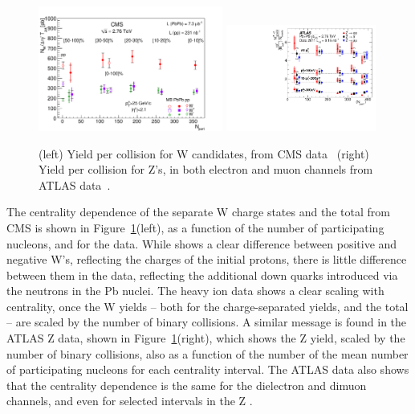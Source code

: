 \begin{figure}[!th]
\begin{center}
\includegraphics[width=0.54\textwidth]{electroweak_figs/Fig2.pdf}
\includegraphics[width=0.44\textwidth]{electroweak_figs/fig_04.pdf}
\caption[]{(left) Yield per collision for W candidates, from CMS data~\cite{Chatrchyan:2012nt} (right) Yield per collision for Z's, in both electron and muon channels from ATLAS data~\cite{Aad:2012ew}.}
\label{fig:pas:zw_cent}
\end{center}
\end{figure}

The centrality dependence of the separate W charge states and the total from CMS
is shown in Figure~\ref{fig:pas:zw_cent}(left),
as a function of the number of participating nucleons, and for the \pp data.
While \pp shows a clear difference between positive and negative W's, reflecting the charges of the initial protons, there is little
difference between them in the \PbPb data, reflecting the additional down quarks introduced via the neutrons in the Pb nuclei.
The heavy ion data shows a clear scaling with centrality, once the W yields -- both for the charge-separated yields, and the
total -- are scaled by the number of binary collisions.
A similar message is found in the ATLAS Z data, shown in Figure~\ref{fig:pas:zw_cent}(right), which shows the Z yield, scaled by
the number of binary collisions, also as a function of the number of the mean number of participating nucleons for each
centrality interval.  The ATLAS data also shows that the centrality dependence is the same for the dielectron and dimuon channels,
and even for selected intervals in the Z \pT.

